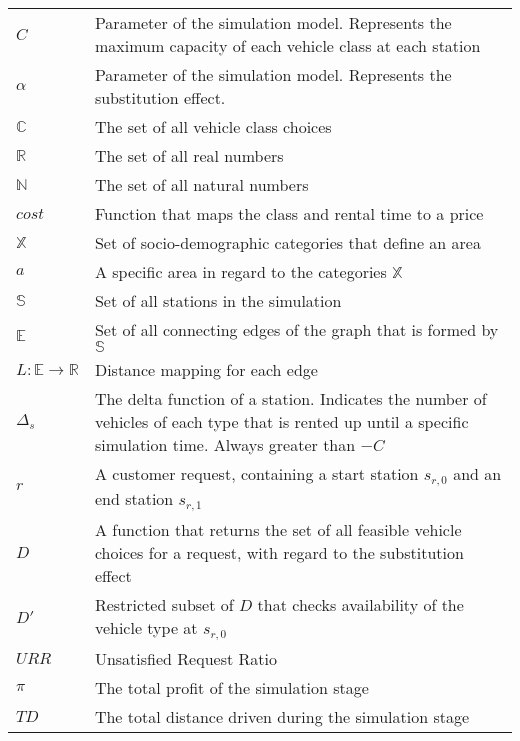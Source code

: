\documentclass[a4paper, oneside, 12pt]{article}
\begin{document}
\begin{tabularx}{\linewidth}{lX}
    $C$ & Parameter of the simulation model. Represents the maximum capacity of each vehicle class at each station \\
    $\alpha$ & Parameter of the simulation model. Represents the substitution effect. \\
    $\mathbb{C}$ & The set of all vehicle class choices \\
    $\mathbb{R}$ & The set of all real numbers \\
    $\mathbb{N}$ & The set of all natural numbers \\
    $cost$ & Function that maps the class and rental time to a price \\
    $\mathbb{X}$ & Set of socio-demographic categories that define an area \\
    $a$ & A specific area in regard to the categories $\mathbb{X}$ \\
    $\mathbb{S}$ & Set of all stations in the simulation \\
    $\mathbb{E}$ & Set of all connecting edges of the graph that is formed by $\mathbb{S}$ \\
    $L: \mathbb{E} \to \mathbb{R}$ & Distance mapping for each edge \\
    $\Delta_s$ & The delta function of a station. Indicates the number of vehicles of each type that is rented up until a specific simulation time. Always greater than $-C$\\
    $r$ & A customer request, containing a start station $s_{r, 0}$ and an end station $s_{r, 1}$ \\
    $D$ & A function that returns the set of all feasible vehicle choices for a request, with regard to the substitution effect \\
    $D'$ & Restricted subset of $D$ that checks availability of the vehicle type at $s_{r, 0}$ \\
    $URR$ & Unsatisfied Request Ratio \\
    $\pi$ & The total profit of the simulation stage \\
    $TD$ & The total distance driven during the simulation stage \\
\end{tabularx}


\clearpage



\end{document}
